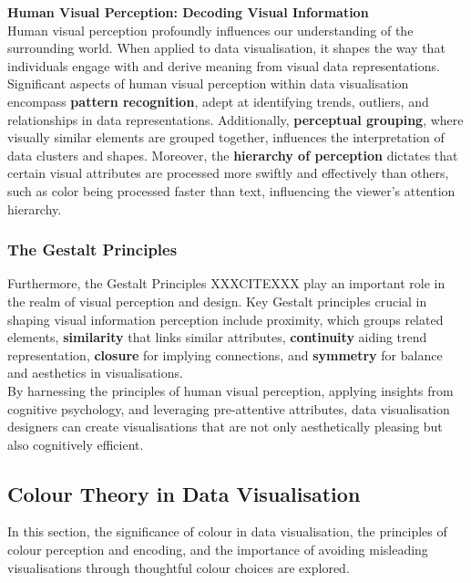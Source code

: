 \documentclass{article}\usepackage[]{graphicx}\usepackage[]{xcolor}
\begin{document}
\noindent \textbf{Human Visual Perception: Decoding Visual Information}\\
Human visual perception profoundly influences our understanding of the surrounding world. When applied to data visualisation, it shapes the way that individuals engage with and derive meaning from visual data representations.\\

\noindent 
Significant aspects of human visual perception within data visualisation encompass \textbf{pattern recognition}, adept at identifying trends, outliers, and relationships in data representations. Additionally, \textbf{perceptual grouping}, where visually similar elements are grouped together, influences the interpretation of data clusters and shapes. Moreover, the \textbf{hierarchy of perception} dictates that certain visual attributes are processed more swiftly and effectively than others, such as color being processed faster than text, influencing the viewer's attention hierarchy.

\subsubsection{The Gestalt Principles}
Furthermore, the Gestalt Principles XXXCITEXXX play an important role in the realm of visual perception and design. Key Gestalt principles crucial in shaping visual information perception include proximity, which groups related elements, \textbf{similarity} that links similar attributes, \textbf{continuity} aiding trend representation, \textbf{closure} for implying connections, and \textbf{symmetry} for balance and aesthetics in visualisations.\\

\noindent By harnessing the principles of human visual perception, applying insights from cognitive psychology, and leveraging pre-attentive attributes, data visualisation designers can create visualisations that are not only aesthetically pleasing but also cognitively efficient.	


\subsection{Colour Theory in Data Visualisation}
In this section, the significance of colour in data visualisation, the principles of colour perception and encoding, and the importance of avoiding misleading visualisations through thoughtful colour choices are explored.\\
\end{document}

